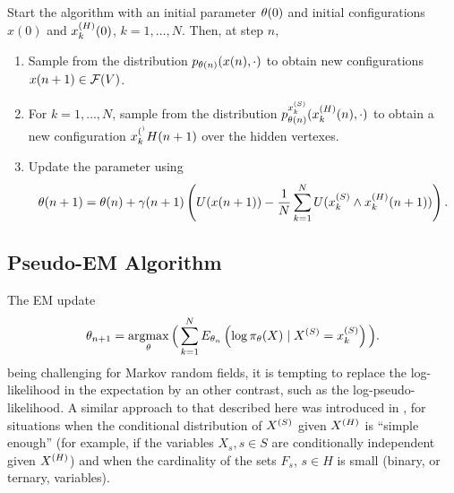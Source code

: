 \begin{algorithm}
\label{alg:mrf.sga.incomplete}
Start the algorithm with an initial parameter
$\theta(0)$ and initial configurations $x(0)$ and
$x_k^{(H)} (0)$, $k=1, \ldots, N$. Then, at step $n$, 
\begin{enumerate}[label=(SGH\arabic*)]
\item Sample from the distribution $ p_{\theta(n)}(x(n) ,
\cdot)$ to obtain new configurations $x(n+1) \in {\mathcal F}(V)$.
\item For $k=1, \ldots, N$, sample from the distribution $ p_{\theta(n)}^{x_k^{(S)}}(x_k^{(H)}(n) ,
\cdot)$ to obtain a new configuration $x_k^{(^)}H(n+1)$ over the hidden vertexes.
\item Update the parameter using
\begin{equation}
\label{eq:stoc.grad.h}
\theta(n+1) = \theta(n) + \gamma(n+1) \left(U(x(n+1)) - \frac1N \sum_{k=1}^N
U(x_k^{(S)}\wedge x_k^{(H)}(n+1))\right).
\end{equation}
\end{enumerate}
\end{algorithm}




\subsection{Pseudo-EM Algorithm}

The EM update
\[
\theta_{n+1} = \operatorname*{argmax}_\theta \Big(\sum_{k=1}^N E_{\theta_n}\left(\log\pi_\theta(X)\mid X^{(S)} = x_k^{(S)}\right)\Big).
\]
being challenging for Markov random fields, it is tempting to replace the log-likelihood in the expectation by an other contrast, such as the log-pseudo-likelihood. A similar approach to that described here was introduced in \citet{chalmond1989iterative}, for situations  when the  conditional distribution
of $X^{(S)}$ given $X^{(H)}$ is ``simple enough'' (for example, if the variables $X_s, s\in S$ are conditionally  independent given $X^{(H)}$) and when the cardinality of the sets $F_s$, $s\in H$ is small (binary, or ternary, variables). 

